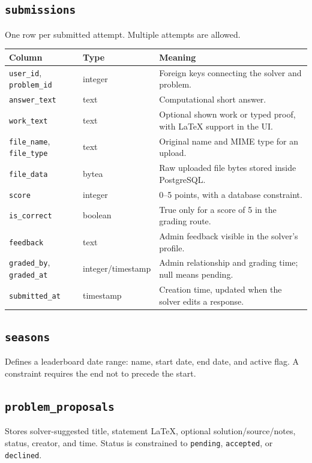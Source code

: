 \documentclass[11pt,oneside]{book}
\newcommand{\code}[1]{\texttt{#1}}
\begin{document}
\subsection{\code{submissions}}
One row per submitted attempt. Multiple attempts are allowed.
\begin{longtable}{p{} p{} p{}}
\toprule
Column & Type & Meaning \\
\midrule
\endhead
\code{user\_id}, \code{problem\_id} & integer & Foreign keys connecting the solver and problem. \\
\code{answer\_text} & text & Computational short answer. \\
\code{work\_text} & text & Optional shown work or typed proof, with LaTeX support in the UI. \\
\code{file\_name}, \code{file\_type} & text & Original name and MIME type for an upload. \\
\code{file\_data} & bytea & Raw uploaded file bytes stored inside PostgreSQL. \\
\code{score} & integer & 0--5 points, with a database constraint. \\
\code{is\_correct} & boolean & True only for a score of 5 in the grading route. \\
\code{feedback} & text & Admin feedback visible in the solver's profile. \\
\code{graded\_by}, \code{graded\_at} & integer/timestamp & Admin relationship and grading time; null means pending. \\
\code{submitted\_at} & timestamp & Creation time, updated when the solver edits a response. \\
\bottomrule
\end{longtable}

\subsection{\code{seasons}}
Defines a leaderboard date range: name, start date, end date, and active flag. A constraint requires the end not to precede the start.

\subsection{\code{problem\_proposals}}
Stores solver-suggested title, statement LaTeX, optional solution/source/notes, status, creator, and time. Status is constrained to \code{pending}, \code{accepted}, or \code{declined}.
\end{document}
